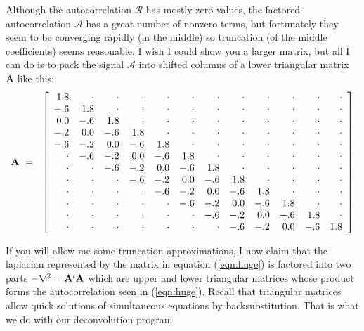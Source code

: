 \par

Although the autocorrelation $\mathcal{R}$ has mostly zero values,
the factored autocorrelation $\mathcal{A}$ has a great number of nonzero terms,
but fortunately they seem to be converging rapidly (in the middle)
so truncation (of the middle coefficients) seems reasonable.
I wish I could show you a larger matrix, but all I can do is to pack
the signal $\mathcal{A}$ into shifted columns of
a lower triangular matrix $\mathbf{A}$ like this:
\begin{equation}
\bold A \ = \ \ 
\left[
\begin{array}{rrrrrrrrrrrr}
  1.8&\cdot&\cdot&\cdot&\cdot&\cdot&\cdot&\cdot&\cdot&\cdot&\cdot&\cdot\\
  -.6&  1.8&\cdot&\cdot&\cdot&\cdot&\cdot&\cdot&\cdot&\cdot&\cdot&\cdot\\
  0.0&  -.6&  1.8&\cdot&\cdot&\cdot&\cdot&\cdot&\cdot&\cdot&\cdot&\cdot\\
  -.2&  0.0&  -.6&  1.8&\cdot&\cdot&\cdot&\cdot&\cdot&\cdot&\cdot&\cdot\\
  -.6&  -.2&  0.0&  -.6&  1.8&\cdot&\cdot&\cdot&\cdot&\cdot&\cdot&\cdot\\
\cdot&  -.6&  -.2&  0.0&  -.6&  1.8&\cdot&\cdot&\cdot&\cdot&\cdot&\cdot\\
\cdot&\cdot&  -.6&  -.2&  0.0&  -.6&  1.8&\cdot&\cdot&\cdot&\cdot&\cdot\\
\cdot&\cdot&\cdot&  -.6&  -.2&  0.0&  -.6&  1.8&\cdot&\cdot&\cdot&\cdot\\
\cdot&\cdot&\cdot&\cdot&  -.6&  -.2&  0.0&  -.6&  1.8&\cdot&\cdot&\cdot\\
\cdot&\cdot&\cdot&\cdot&\cdot&  -.6&  -.2&  0.0&  -.6&  1.8&\cdot&\cdot\\
\cdot&\cdot&\cdot&\cdot&\cdot&\cdot&  -.6&  -.2&  0.0&  -.6&  1.8&\cdot\\
\cdot&\cdot&\cdot&\cdot&\cdot&\cdot&\cdot&  -.6&  -.2&  0.0&  -.6&  1.8
\end{array}
\right]
\label{eqn:lapfacmat}
\end{equation}

If you will allow me some truncation approximations,
I now claim that the laplacian represented by the
matrix in equation (\ref{eqn:huge})
is factored into two parts
$-\nabla^2 =\bold A'\bold A$
which are upper and lower triangular matrices
whose product forms the autocorrelation seen in (\ref{eqn:huge}).
Recall that triangular matrices
allow quick solutions of simultaneous equations by backsubstitution.
That is what we do with our
deconvolution program.



